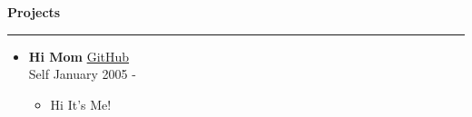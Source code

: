 \textbf{Projects} 
 \par\noindent\rule{\textwidth}{0.2pt} 
 \begin{itemize} 
\item {\textbf{Hi Mom} \hfill \faGithub \hspace{.5pt} \href{www.google.com}{GitHub} \\ 
 Self \hfill {January 2005 - } 
 { 
 \begin{itemize} 
 \item {Hi It's Me!} 
 \end{itemize} 
 }} 
\end{itemize}
